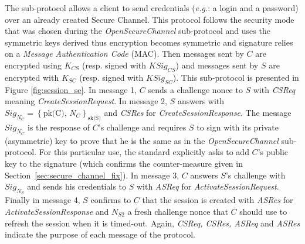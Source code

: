 \newcommand{\csreq}{CSReq}
\newcommand{\csres}{CSRes}
\newcommand{\asreq}{ASReq}
\newcommand{\asres}{ASRes}

The  sub-protocol allows a client to send
credentials (\emph{e.g.}: a login and a password) over an already
created Secure Channel.  This protocol follows the security mode that
was chosen during the {\em OpenSecureChannel} sub-protocol and uses
the symmetric keys derived thus encryption becomes symmetric and
signature relies on a \emph{Message Authentication Code} (MAC).  Then
messages sent by $C$ are encrypted using $K_{CS}$ (resp. signed with
$KSig_{CS}$) and messages sent by $S$ are encrypted with $K_{SC}$
(resp. signed with $KSig_{SC}$).  This sub-protocol is presented in
Figure \ref{fig:session_se}.  In message 1, $C$ sends a challenge
nonce to $S$ with {\em CSReq} meaning {\em CreateSessionRequest}.  In
message 2, $S$ answers with $Sig_{N_{C}} = \left\{\mbox{pk(C),
  $N_{C}$}\right\}_{\mbox{sk(S)}}$ and {\em CSRes} for {\em
  CreateSessionResponse}. The message $Sig_{N_{C}}$ is the response of $C$'s
challenge and requires $S$ to sign with its private (asymmetric) key
to prove that he is the same as in the {\em OpenSecureChannel}
sub-protocol.  For this particular use, the \opcua standard explicitly
asks to add $C$'s public key to the signature (which confirms the
counter-measure given in Section~\ref{sec:secure_channel_fix}).  In
message 3, $C$ answers $S$'s challenge with $Sig_{N_{S}}$ and sends
his credentials to $S$ with {\em ASReq} for {\em
  ActivateSessionRequest}.  Finally in message 4, $S$ confirms to $C$
that the session is created with {\em ASRes} for {\em
  ActivateSessionResponse} and $N_{S2}$ a fresh challenge nonce that
$C$ should use to refresh the session when it is timed-out.  Again,
{\em CSReq, CSRes, ASReq} and {\em ASRes} indicate the purpose of each
message of the protocol.

